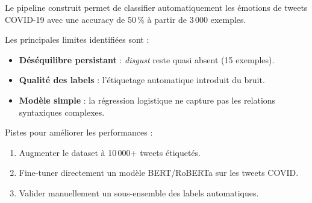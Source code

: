 \documentclass[12pt, a4paper]{article}
\begin{document}
Le pipeline construit permet de classifier automatiquement les émotions de tweets COVID-19
avec une accuracy de 50\,\% à partir de 3\,000 exemples.

Les principales limites identifiées sont :
\begin{itemize}
    \item \textbf{Déséquilibre persistant} : \textit{disgust} reste quasi absent (15 exemples).
    \item \textbf{Qualité des labels} : l'étiquetage automatique introduit du bruit.
    \item \textbf{Modèle simple} : la régression logistique ne capture pas les relations
          syntaxiques complexes.
\end{itemize}

Pistes pour améliorer les performances :
\begin{enumerate}
    \item Augmenter le dataset à 10\,000+ tweets étiquetés.
    \item Fine-tuner directement un modèle BERT/RoBERTa sur les tweets COVID.
    \item Valider manuellement un sous-ensemble des labels automatiques.
\end{enumerate}
\end{document}
